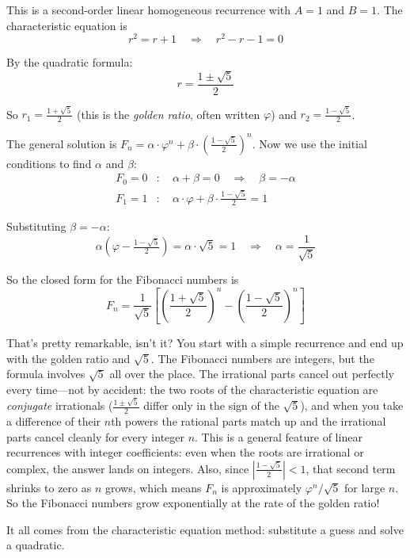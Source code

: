 \documentclass[11pt]{article}
\begin{document}
This is a second-order linear homogeneous recurrence with $A = 1$ and $B = 1$. The characteristic equation is
\[
r^2 = r + 1 \quad \Longrightarrow \quad r^2 - r - 1 = 0
\]

By the quadratic formula:
\[
r = \frac{1 \pm \sqrt{5}}{2}
\]

So $r_1 = \frac{1 + \sqrt{5}}{2}$ (this is the \emph{golden ratio}, often written $\varphi$) and $r_2 = \frac{1 - \sqrt{5}}{2}$.

The general solution is $F_n = \alpha \cdot \varphi^n + \beta \cdot \left(\frac{1-\sqrt{5}}{2}\right)^n$. Now we use the initial conditions to find $\alpha$ and $\beta$:
\begin{align*}
F_0 = 0 &: \quad \alpha + \beta = 0 \quad \Longrightarrow \quad \beta = -\alpha \\
F_1 = 1 &: \quad \alpha \cdot \varphi + \beta \cdot \tfrac{1-\sqrt{5}}{2} = 1
\end{align*}

Substituting $\beta = -\alpha$:
\[
\alpha \left(\varphi - \tfrac{1-\sqrt{5}}{2}\right) = \alpha \cdot \sqrt{5} = 1 \quad \Longrightarrow \quad \alpha = \frac{1}{\sqrt{5}}
\]

So the closed form for the Fibonacci numbers is
\[
F_n = \frac{1}{\sqrt{5}}\left[\left(\frac{1+\sqrt{5}}{2}\right)^n - \left(\frac{1-\sqrt{5}}{2}\right)^n\right]
\]

That's pretty remarkable, isn't it? You start with a simple recurrence and end up with the golden ratio and $\sqrt{5}$. The Fibonacci numbers are integers, but the formula involves $\sqrt{5}$ all over the place. The irrational parts cancel out perfectly every time---not by accident: the two roots of the characteristic equation are \emph{conjugate} irrationals ($\frac{1 \pm \sqrt{5}}{2}$ differ only in the sign of the $\sqrt{5}$), and when you take a difference of their $n$th powers the rational parts match up and the irrational parts cancel cleanly for every integer $n$. This is a general feature of linear recurrences with integer coefficients: even when the roots are irrational or complex, the answer lands on integers. Also, since $\left|\frac{1-\sqrt{5}}{2}\right| < 1$, that second term shrinks to zero as $n$ grows, which means $F_n$ is approximately $\varphi^n / \sqrt{5}$ for large $n$. So the Fibonacci numbers grow exponentially at the rate of the golden ratio!

It all comes from the characteristic equation method: substitute a guess and solve a quadratic.
\end{document}
